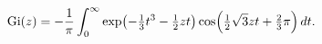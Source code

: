 \[\mathop{\mathrm{Gi}\/}\nolimits\!\left(z\right)=-\frac{1}{\pi}\int_{0}^{\infty%
}\mathop{\exp\/}\nolimits\!\left(-\tfrac{1}{3}t^{3}-\tfrac{1}{2}zt\right)%
\mathop{\cos\/}\nolimits\!\left(\tfrac{1}{2}\sqrt{3}zt+\tfrac{2}{3}\pi\right)dt.\]